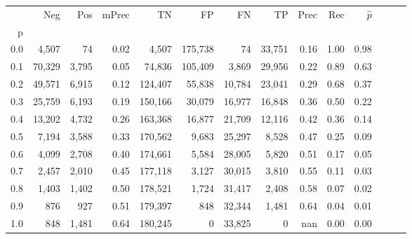 \begin{tabular}{rrrrrrrrrrrrrr}
\toprule
{} &     Neg &    Pos & mPrec &       TN &       FP &      FN &      TP &  Prec &   Rec & $\hat{p}$ \\
p   &         &        &       &          &          &         &         &       &       &           \\
\midrule
0.0 &   4,507 &     74 &  0.02 &    4,507 &  175,738 &      74 &  33,751 &  0.16 &  1.00 &      0.98 \\
0.1 &  70,329 &  3,795 &  0.05 &   74,836 &  105,409 &   3,869 &  29,956 &  0.22 &  0.89 &      0.63 \\
0.2 &  49,571 &  6,915 &  0.12 &  124,407 &   55,838 &  10,784 &  23,041 &  0.29 &  0.68 &      0.37 \\
0.3 &  25,759 &  6,193 &  0.19 &  150,166 &   30,079 &  16,977 &  16,848 &  0.36 &  0.50 &      0.22 \\
0.4 &  13,202 &  4,732 &  0.26 &  163,368 &   16,877 &  21,709 &  12,116 &  0.42 &  0.36 &      0.14 \\
0.5 &   7,194 &  3,588 &  0.33 &  170,562 &    9,683 &  25,297 &   8,528 &  0.47 &  0.25 &      0.09 \\
0.6 &   4,099 &  2,708 &  0.40 &  174,661 &    5,584 &  28,005 &   5,820 &  0.51 &  0.17 &      0.05 \\
0.7 &   2,457 &  2,010 &  0.45 &  177,118 &    3,127 &  30,015 &   3,810 &  0.55 &  0.11 &      0.03 \\
0.8 &   1,403 &  1,402 &  0.50 &  178,521 &    1,724 &  31,417 &   2,408 &  0.58 &  0.07 &      0.02 \\
0.9 &     876 &    927 &  0.51 &  179,397 &      848 &  32,344 &   1,481 &  0.64 &  0.04 &      0.01 \\
1.0 &     848 &  1,481 &  0.64 &  180,245 &        0 &  33,825 &       0 &   nan &  0.00 &      0.00 \\
\bottomrule
\end{tabular}
